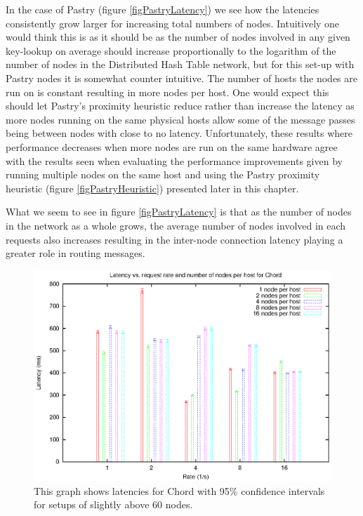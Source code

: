 In the case of Pastry (figure \ref{figPastryLatency}) we see how the latencies consistently grow larger for increasing total numbers of nodes. Intuitively one would think this is as it should be as the number of nodes involved in any given key-lookup on average should increase proportionally to the logarithm of the number of nodes in the Distributed Hash Table network, but for this set-up with Pastry nodes it is somewhat counter intuitive. The number of hosts the nodes are run on is constant resulting in more nodes per host. One would expect this should let Pastry's proximity heuristic reduce rather than increase the latency as more nodes running on the same physical hosts allow some of the message passes being between nodes with close to no latency.
Unfortunately, these results where performance decreases when more nodes are run on the same hardware agree with the results seen when evaluating the performance improvements given by running multiple nodes on the same host and using the Pastry proximity heuristic (figure \ref{figPastryHeuristic}) presented later in this chapter. 

What we seem to see in figure \ref{figPastryLatency} is that as the number of nodes in the network as a whole grows, the average number of nodes involved in each requests also increases resulting in the inter-node connection latency playing a greater role in routing messages.

\begin{figure}[!htbp]
  \begin{center}
    \includegraphics[width=0.9\linewidth]{illustrations/latency_chord.eps}
    \caption{This graph shows latencies for Chord with 95\% confidence intervals for setups of slightly above 60 nodes.}
    \label{figChordLatency}
  \end{center}
\end{figure}

